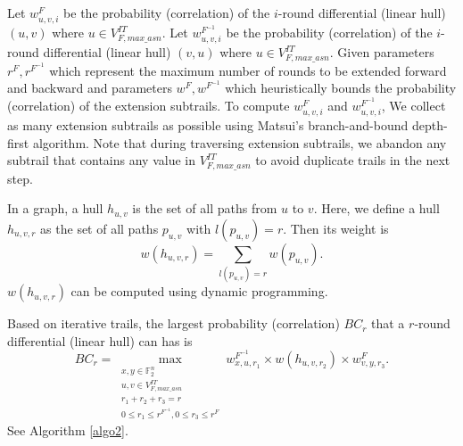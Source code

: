 Let $w^F_{u,v,i}$ be the probability (correlation) of the $i$-round differential (linear hull) $(u,v)$ where $u\in V^{IT}_{F,max\_asn}$. Let $w^{F^{-1}}_{u,v,i}$ be the probability (correlation) of the $i$-round differential (linear hull) $(v,u)$ where $u\in V^{IT}_{F,max\_asn}$. Given parameters $r^F,r^{F^{-1}}$ which represent the maximum number of rounds to be extended forward and backward and parameters $w^F,w^{F^{-1}}$ which heuristically bounds the probability (correlation) of the extension subtrails. To compute $w^F_{u,v,i}$ and $w^{F^{-1}}_{u,v,i}$, We collect as many extension subtrails as possible using Matsui's branch-and-bound depth-first algorithm. Note that during traversing extension subtrails, we abandon any subtrail that contains any value in $V^{IT}_{F,max\_asn}$ to avoid duplicate trails in the next step.

In a graph, a hull $h_{u,v}$ is the set of all paths from $u$ to $v$. Here, we define a hull $h_{u,v,r}$ as the set of all paths $p_{u,v}$ with $l(p_{u,v})=r$. Then its weight is
\[
	w(h_{u,v,r})=\sum\limits_{l(p_{u,v})=r} w(p_{u,v}).
\]
$w(h_{u,v,r})$ can be computed using dynamic programming.

Based on iterative trails, the largest probability (correlation) $BC_r$ that a $r$-round differential (linear hull) can has is
\[
	BC_r=\max\limits_{\substack{x,y\in \mathbb{F}_2^n\\u,v\in V^{IT}_{F,max\_asn}\\r_1+r_2+r_3=r\\0\leq r_1\leq r^{F^{-1}},0\leq r_3\leq r^F}} w^{F^{-1}}_{x,u,r_1}\times w(h_{u,v,r_2})\times w^F_{v,y,r_3}.
\]
See Algorithm \ref{algo2}. 


